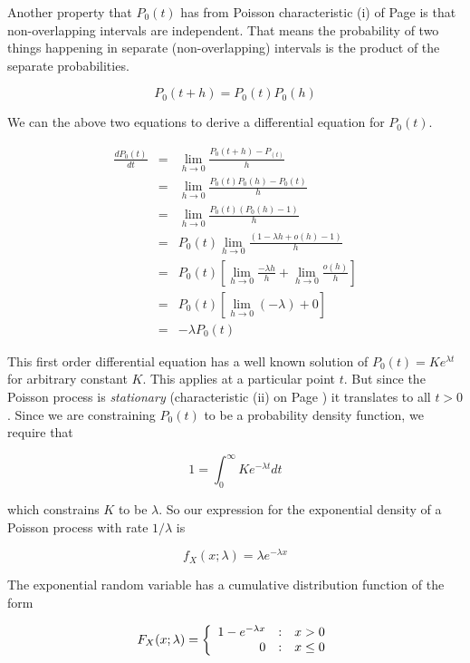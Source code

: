 \documentclass[]{article}
\begin{document}
Another property that $P_0(t)$ has from Poisson characteristic
(i) of Page \pageref{poisson_properties} is that non-overlapping
intervals are independent.  That means the probability of two
things happening in separate (non-overlapping) intervals is the
product of the separate probabilities.

$$
P_0(t+h) = P_0(t)P_0(h)
$$

We can the above two equations to derive a differential equation
for $P_0(t)$.

\begin{eqnarray}
\frac{dP_0(t)}{dt} &= & \lim_{h \to 0} \frac{P_0(t+h) - P_(t)}{h} \nonumber \\
  &= & \lim_{h \to 0} \frac{P_0(t)P_0(h) - P_0(t)}{h} \nonumber \\
  &= & \lim_{h \to 0} \frac{P_0(t)(P_0(h) - 1)}{h} \nonumber \\
  &= & P_0(t)\lim_{h \to 0} \frac{(1 - \lambda h + o(h) - 1)}{h} \nonumber \\
  &= & P_0(t)\left[ \lim_{h \to 0} \frac{-\lambda h}{h} 
     + \lim_{h \to 0} \frac{o(h)}{h} \right] \nonumber \\
  &= & P_0(t)\left[ \lim_{h \to 0} (-\lambda)
     + 0 \right] \nonumber \\
  &= & -\lambda P_0(t) \label{exp_de}
\end{eqnarray}

This first order differential equation has a well known solution
of $P_0(t) = Ke^{\lambda t}$ for arbitrary constant $K$.
This applies at a particular point $t$.
But since the Poisson process is
\emph{stationary} 
(characteristic (ii) on Page \pageref{poisson_properties})
it translates to all $t > 0$.
Since we are constraining $P_0(t)$ to be a probability 
density function, we require that

$$
1 = \int_0^{\infty} K e^{-\lambda t} dt
$$

which constrains $K$ to be $\lambda$. So our expression for the
exponential density of a Poisson process with rate $1/\lambda$
is

\begin{equation} \label{exp_density}
f_X(x; \lambda) = \lambda e^{-\lambda x}
\end{equation}

The exponential random variable has a cumulative distribution
function of the form

\begin{equation} \label{exp_cdf}
F_X(x; \lambda) = \left\{ \begin{array}{r@{\quad:\quad}l}
   1 - e^{-\lambda x} & x > 0 \\
   0 & x \le 0
 \end{array} \right.
\end{equation}
\end{document}
